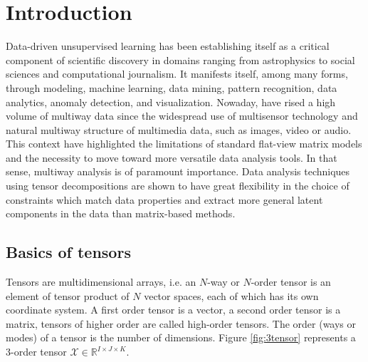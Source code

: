 \documentclass[letterpaper,12pt]{article}
\begin{document}
  



\clearpage


\clearpage

\tableofcontents

\newpage

\section{Introduction}

Data-driven unsupervised learning has been establishing itself as a critical component of scientific discovery in domains ranging from astrophysics to social sciences and computational journalism. It manifests itself, among many forms, through modeling, machine learning, data mining, pattern recognition, data analytics, anomaly detection, and visualization. Nowaday, have rised a high volume of multiway data since the widespread use of multisensor technology and natural multiway structure of multimedia data, such as images, video or audio. This context have highlighted the limitations of standard flat-view matrix models and the necessity to move toward more versatile data analysis tools. In that sense, multiway analysis is of paramount importance. Data analysis techniques using tensor decompositions are shown to have great flexibility in the choice of constraints which match data properties and extract more general latent components in the data than matrix-based methods.

\subsection{Basics of tensors}

Tensors are multidimensional arrays, i.e. an $N$-way or $N$-order tensor is an element of tensor product of $N$ vector spaces, each of which has its own coordinate system. A first order tensor is a vector, a second order tensor is a matrix, tensors of higher order are called high-order tensors. The order (ways or modes) of a tensor is the number of dimensions. Figure \ref{fig:3tensor} represents a 3-order tensor $\mathcal{X}\in\mathbb{R}^{I\times J\times K}$.
\end{document}

